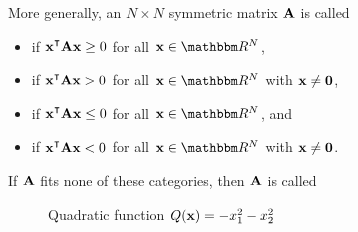\begin{frame}

    \vspace{2em}
    More generally, an $N \times N$ symmetric matrix $\mathbf A$ is called
    \begin{itemize}
        \item {} if $\boldx^\T \boldA \boldx \geq 0$
            for all $\boldx \in \RR^N$, 
        \item {} if $\boldx^\T \boldA \boldx > 0$ for all $\boldx
            \in \RR^N$ with ${\mathbf x} \not= {\mathbf 0}$,
        \item {} if $\boldx^\T \boldA \boldx \leq 0$
            for all $\boldx \in \RR^N$, and
        \item {} if $\boldx^\T \boldA \boldx < 0$ for all $\boldx
            \in \RR^N$ with ${\mathbf x} \not= {\mathbf 0}$.
    \end{itemize}
    
    \vspace{.7em}
    If $\mathbf A$ fits none of these categories, then $\mathbf A$ is called 
    
\end{frame}

\begin{frame}

     \vspace{2em}
    \begin{figure}
   \begin{center}
    \caption{\label{f:qform_nd} Quadratic function $Q({\mathbf x}) = -x_1^2 - x_2^2$ }
   \end{center}
    \end{figure}
    
\end{frame}

